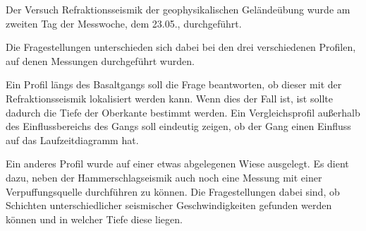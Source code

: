 Der Versuch Refraktionsseismik der geophysikalischen Geländeübung wurde am zweiten Tag der Messwoche, dem 23.05., durchgeführt.

Die Fragestellungen unterschieden sich dabei bei den drei verschiedenen Profilen, auf denen Messungen durchgeführt wurden.

Ein Profil längs des Basaltgangs soll die Frage beantworten, ob dieser mit der Refraktionsseismik lokalisiert werden kann. Wenn dies der Fall ist, ist sollte dadurch die Tiefe der Oberkante bestimmt werden. Ein Vergleichsprofil außerhalb des Einflussbereichs des Gangs soll eindeutig zeigen, ob der Gang einen Einfluss auf das Laufzeitdiagramm hat. 

Ein anderes Profil wurde auf einer etwas abgelegenen Wiese ausgelegt. Es dient dazu, neben der Hammerschlagseismik auch noch eine Messung mit einer Verpuffungsquelle durchführen zu können. Die Fragestellungen dabei sind, ob Schichten unterschiedlicher seismischer Geschwindigkeiten gefunden werden können und in welcher Tiefe diese liegen.